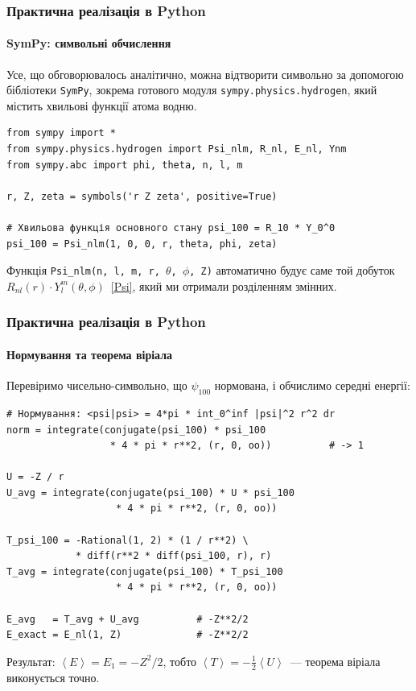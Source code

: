 \documentclass[]{beamer}
\begin{document}
\begin{frame}[fragile]
	\frametitle{Практична реалізація в Python}
	\framesubtitle{SymPy: символьні обчислення}

	Усе, що обговорювалось аналітично, можна відтворити символьно за допомогою бібліотеки \texttt{SymPy}, зокрема готового модуля \texttt{sympy.physics.hydrogen}, який містить хвильові функції атома водню.

	\begin{verbatim}
from sympy import *
from sympy.physics.hydrogen import Psi_nlm, R_nl, E_nl, Ynm
from sympy.abc import phi, theta, n, l, m

r, Z, zeta = symbols('r Z zeta', positive=True)

# Хвильова функція основного стану psi_100 = R_10 * Y_0^0
psi_100 = Psi_nlm(1, 0, 0, r, theta, phi, zeta)
	\end{verbatim}

	Функція \texttt{Psi\_nlm(n, l, m, r, $\theta$, $\phi$, Z)} автоматично будує саме той добуток $R_{nl}(r)\cdot Y_l^m(\theta,\phi)$~\eqref{Psi}, який ми отримали розділенням змінних.
\end{frame}
\begin{frame}[fragile]
	\frametitle{Практична реалізація в Python}
	\framesubtitle{Нормування та теорема віріала}

	Перевіримо чисельно-символьно, що $\psi_{100}$ нормована, і обчислимо середні енергії:
	\begin{verbatim}
# Нормування: <psi|psi> = 4*pi * int_0^inf |psi|^2 r^2 dr
norm = integrate(conjugate(psi_100) * psi_100
                  * 4 * pi * r**2, (r, 0, oo))          # -> 1

U = -Z / r
U_avg = integrate(conjugate(psi_100) * U * psi_100
                   * 4 * pi * r**2, (r, 0, oo))

T_psi_100 = -Rational(1, 2) * (1 / r**2) \
            * diff(r**2 * diff(psi_100, r), r)
T_avg = integrate(conjugate(psi_100) * T_psi_100
                   * 4 * pi * r**2, (r, 0, oo))

E_avg   = T_avg + U_avg          # -Z**2/2
E_exact = E_nl(1, Z)             # -Z**2/2
	\end{verbatim}

	Результат: $\left\langle E\right\rangle = E_1 = -Z^2/2$, тобто $\left\langle T\right\rangle = -\tfrac12\left\langle U\right\rangle$~--- теорема віріала виконується точно.
\end{frame}
\end{document}
